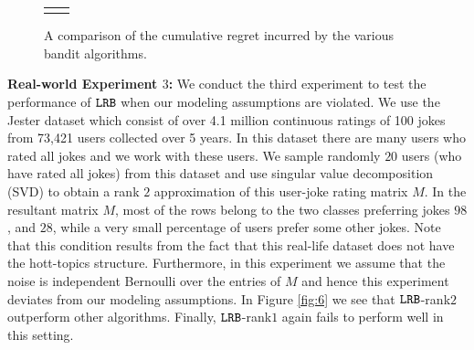 \begin{figure}[!th]
\begin{tabular}{cc}
{  		\label{fig:4}
    }
    \end{tabular}
    \caption{A comparison of the cumulative regret incurred by the various bandit algorithms. }
    \label{fig:karmed1}
    \vspace*{-1em}
\end{figure}
\textbf{Real-world Experiment $3$:} We conduct the third experiment to test the performance of ${\tt LRB}$ when our modeling assumptions are violated. We use the Jester dataset \citep{goldberg2001eigentaste} which consist of over 4.1 million continuous ratings of 100 jokes from 73,421 users collected over 5 years. In this dataset there are many users who rated all jokes and we work with these users. We sample randomly $20$ users (who have rated all jokes) from this dataset and use singular value decomposition (SVD) to obtain a rank $2$ approximation of this user-joke rating matrix $M$. In the resultant matrix $M$, most of the rows belong to the two classes preferring jokes $98$, and $28$, while a very small percentage of users prefer some other jokes. Note that this condition results from the fact that this real-life dataset does not have the hott-topics structure. Furthermore, in this experiment we assume that the noise is independent Bernoulli over the entries of $M$ and hence this experiment deviates from our modeling assumptions. In Figure \ref{fig:6} we see that ${\tt LRB}$-rank$2$ outperform other algorithms. Finally, ${\tt LRB}$-rank$1$ again fails to perform well in this setting.
